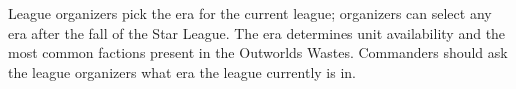 League organizers pick the era for the current league; organizers can select any era after the fall of the Star League.
The era determines unit availability and the most common factions present in the Outworlds Wastes.
Commanders should ask the league organizers what era the league currently is in.
